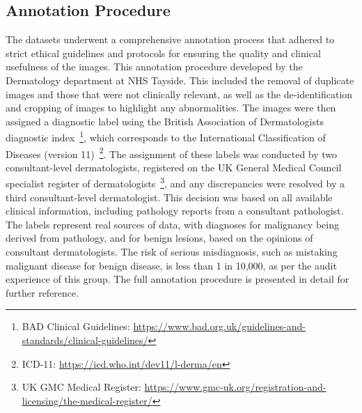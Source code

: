 \subsection{Annotation Procedure}
\label{subsec:annotation_procedure}
The datasets underwent a comprehensive annotation process that adhered to strict ethical guidelines and protocols for ensuring the quality and clinical usefulness of the images. This annotation procedure developed by the Dermatology department at NHS Tayside. This included the removal of duplicate images and those that were not clinically relevant, as well as the de-identification and cropping of images to highlight any abnormalities. The images were then assigned a diagnostic label using the British Association of Dermatologists diagnostic index~\footnote{BAD Clinical Guidelines: \url{https://www.bad.org.uk/guidelines-and-standards/clinical-guidelines/}}, which corresponds to the International Classification of Diseases (version 11)~\footnote{ICD-11: \url{https://icd.who.int/dev11/l-derma/en}}. The assignment of these labels was conducted by two consultant-level dermatologists, registered on the UK General Medical Council specialist register of dermatologists~\footnote{UK GMC Medical Register: \url{https://www.gmc-uk.org/registration-and-licensing/the-medical-register/}}, and any discrepancies were resolved by a third consultant-level dermatologist. This decision was based on all available clinical information, including pathology reports from a consultant pathologist. The labels represent real sources of data, with diagnoses for malignancy being derived from pathology, and for benign lesions, based on the opinions of consultant dermatologists. The risk of serious misdiagnosis, such as mistaking malignant disease for benign disease, is less than 1 in 10,000, as per the audit experience of this group. The full annotation procedure is presented in detail for further reference.


